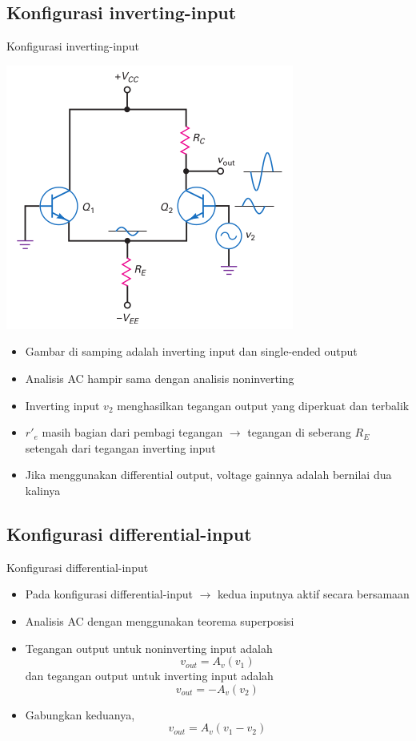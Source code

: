 \documentclass[aspectratio=169]{beamer}
\begin{document}
\subsection{Konfigurasi inverting-input}
\begin{frame}{Konfigurasi inverting-input}
	\begin{multicols}{2}
		\begin{center}
			\includegraphics[height=0.7\textheight]{gambar/01.diff-amp/01.inverting_input_+single-ended_output}
		\end{center}
		\columnbreak
		\begin{itemize}
			\item Gambar di samping adalah inverting input dan single-ended output
			\item Analisis AC hampir sama dengan analisis noninverting
			\item Inverting input $ v_2 $ menghasilkan tegangan output yang diperkuat dan terbalik
			\item $ r'_e $ masih bagian dari pembagi tegangan $ \rightarrow $ tegangan di seberang $ R_E $ setengah dari tegangan inverting input
			\item Jika menggunakan differential output, voltage gainnya adalah bernilai dua kalinya
		\end{itemize}
	\end{multicols}
\end{frame}

\subsection{Konfigurasi differential-input}
\begin{frame}{Konfigurasi differential-input}
	\begin{itemize}
		\item Pada konfigurasi differential-input $ \rightarrow $ kedua inputnya aktif secara bersamaan
		\item Analisis AC dengan menggunakan teorema superposisi
		\item Tegangan output untuk noninverting input adalah $$ v_{out} = A_v(v_1) $$ dan tegangan output untuk inverting input adalah $$ v_{out} = -A_v (v_2) $$
		\item Gabungkan keduanya, $$ v_{out} = A_v (v_1 - v_2) $$
	\end{itemize}
\end{frame}
\end{document}
